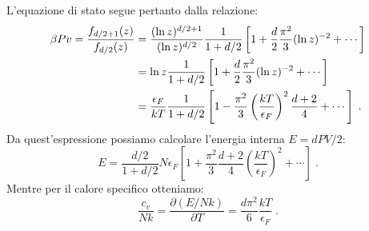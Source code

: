 \documentclass[10pt,a4paper]{report}
\theoremstyle{definition}
\numberwithin{equation}{section}
\begin{document}
L'equazione di stato segue pertanto dalla relazione:
\begin{align}
\beta Pv =\frac{f_{d/2+1}(z)}{f_{d/2}(z)} &= \frac{(\ln z)^{d/2+1}}{(\ln z)^{d/2}}\frac{1}{1+d/2}\left[1+\frac{d}{2}\frac{\pi^2}{3}(\ln z)^{-2}+\cdots \right] \notag \\
&= \ln z \frac{1}{1+d/2}\left[1+\frac{d}{2}\frac{\pi^2}{3}(\ln z)^{-2}+\cdots\right] \notag \\
&= \frac{\epsilon_F}{kT}\frac{1}{1+d/2}\left[1-\frac{\pi^2}{3}\left(\frac{kT}{\epsilon_F}\right)^2\frac{d+2}{4}+\cdots\right]\;.
\end{align}
Da quest'espressione possiamo calcolare l'energia interna $E=dPV/2$:
\begin{equation}
E=\frac{d/2}{1+d/2}N\epsilon_F\left[1+\frac{\pi^2}{3}\frac{d+2}{4}\left(\frac{kT}{\epsilon_F}\right)^2+\cdots\right]\;.
\end{equation}
Mentre per il calore specifico otteniamo:
\begin{equation}
\frac{c_v}{Nk}=\frac{\partial(E/Nk)}{\partial T}=\frac{d\pi^2}{6}\frac{kT}{\epsilon_F}\;.
\end{equation}
\end{document}
